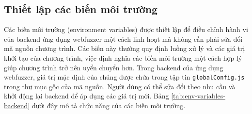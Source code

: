 \subsection{Thiết lập các biến môi trường}
Các biến môi trường (environment variables) được thiết lập để điều chỉnh hành vi của backend ứng dụng webfuzzer một cách linh hoạt mà không cần phải sửa đổi mã nguồn chương trình. Các biến này thường quy định luồng xử lý và các giá trị khởi tạo của chương trình, việc định nghĩa các biến môi trường một cách hợp lý giúp chương trình trở nên uyển chuyển hơn. Trong backend của ứng dụng webfuzzer, giá trị mặc định của chúng được chứa trong tập tin \texttt{globalConfig.js} trong thư mục gốc của mã nguồn. Người dùng có thể sửa đổi theo nhu cầu và khởi động lại backend để áp dụng các giá trị mới. Bảng \ref{tab:env-variables-backend} dưới đây mô tả chức năng của các biến môi trường.
\FloatBarrier
